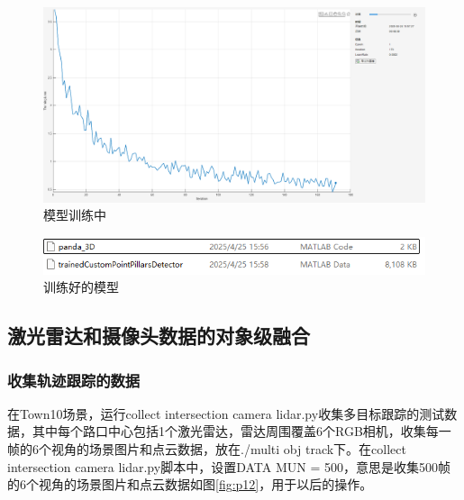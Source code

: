 \begin{figure}[htbp] %
	\centering
	\includegraphics[width=1\textwidth]{p30} %
	\caption{模型训练中} %
	\label{fig:p30} %
\end{figure}








\begin{figure}[htbp] %
	\centering
	\includegraphics[width=1\textwidth]{p11} %
	\caption{训练好的模型} %
	\label{fig:p11} %
\end{figure}






\subsection{激光雷达和摄像头数据的对象级融合}
\subsubsection{收集轨迹跟踪的数据}
在Town10场景，运行collect intersection camera lidar.py收集多目标跟踪的测试数据，其中每个路口中心包括1个激光雷达，雷达周围覆盖6个RGB相机，收集每一帧的6个视角的场景图片和点云数据，放在./multi obj track下。在collect intersection camera lidar.py脚本中，设置DATA MUN = 500，意思是收集500帧的6个视角的场景图片和点云数据如图\ref{fig:p12}，用于以后的操作。



